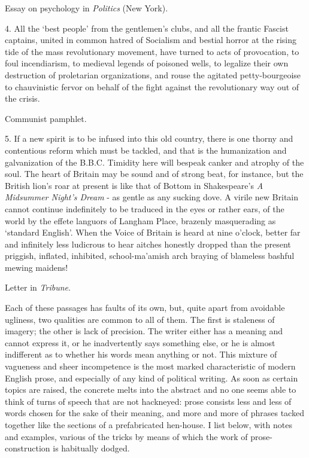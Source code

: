 \begin{rquote}
Essay on psychology in \textit{Politics }(New York).
\end{rquote}

\begin{rquote}
4. All the ‘best people’ from the gentlemen’s clubs, and all the frantic Fascist captains, united in common hatred of Socialism and bestial horror at the rising tide of the mass revolutionary movement, have turned to acts of provocation, to foul incendiarism, to medieval legends of poisoned wells, to legalize their own destruction of proletarian organizations, and rouse the agitated petty-bourgeoise to chauvinistic fervor on behalf of the fight against the revolutionary way out of the crisis.
\end{rquote}

\begin{rquote}
Communist pamphlet.
\end{rquote}

\begin{rquote}
5. If a new spirit is to be infused into this old country, there is one thorny and contentious reform which must be tackled, and that is the humanization and galvanization of the B.B.C. Timidity here will bespeak canker and atrophy of the soul. The heart of Britain may be sound and of strong beat, for instance, but the British lion’s roar at present is like that of Bottom in Shakespeare’s \textit{A Midsummer Night’s Dream} - as gentle as any sucking dove. A virile new Britain cannot continue indefinitely to be traduced in the eyes or rather ears, of the world by the effete languors of Langham Place, brazenly masquerading as ‘standard English’. When the Voice of Britain is heard at nine o’clock, better far and infinitely less ludicrous to hear aitches honestly dropped than the present priggish, inflated, inhibited, school-ma’amish arch braying of blameless bashful mewing maidens!
\end{rquote}

\begin{rquote}
Letter in \textit{Tribune}.
\end{rquote}

Each of these passages has faults of its own, but, quite apart from avoidable ugliness, two qualities are common to all of them. The first is staleness of imagery; the other is lack of precision. The writer either has a meaning and cannot express it, or he inadvertently says something else, or he is almost indifferent as to whether his words mean anything or not. This mixture of vagueness and sheer incompetence is the most marked characteristic of modern English prose, and especially of any kind of political writing. As soon as certain topics are raised, the concrete melts into the abstract and no one seems able to think of turns of speech that are not hackneyed: prose consists less and less of words chosen for the sake of their meaning, and more and more of phrases tacked together like the sections of a prefabricated hen-house. I list below, with notes and examples, various of the tricks by means of which the work of prose-construction is habitually dodged.\par

